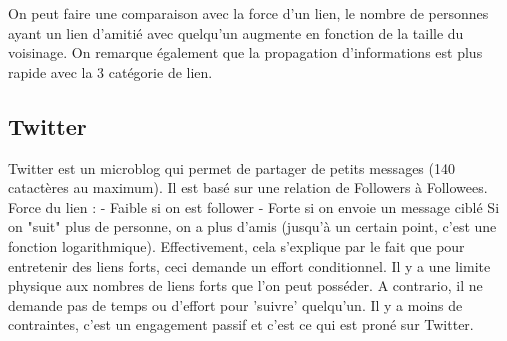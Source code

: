 On peut faire une comparaison avec la force d'un lien, le nombre de personnes ayant un lien d'amitié avec quelqu'un augmente en fonction de la taille du voisinage. 
On remarque également que la propagation d'informations est plus rapide avec la 3 catégorie de lien.
\newline
\subsection{Twitter}
Twitter est un microblog qui permet de partager de petits messages (140 catactères au maximum). Il est basé sur une relation de Followers à Followees.
Force du lien :
- Faible si on est follower
- Forte si on envoie un message ciblé
Si on "suit" plus de personne, on a plus d'amis (jusqu'à un certain point, c'est une fonction logarithmique). Effectivement, cela s'explique par le fait que pour entretenir des liens forts, ceci demande un effort conditionnel. Il y a une limite physique aux nombres de liens forts que l'on peut posséder. A contrario, il ne demande pas de temps ou d'effort pour 'suivre' quelqu'un. Il y a moins de contraintes, c'est un engagement passif et c'est ce qui est proné sur Twitter.
